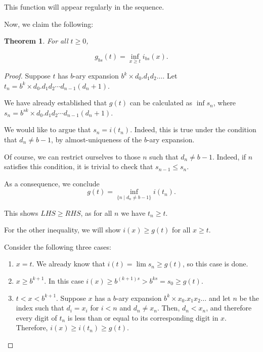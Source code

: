 \documentclass[11pt, reqno]{amsart}
\newtheorem{theorem}{Theorem}
\begin{document}
This function will appear regularly in the sequence.

Now, we claim the following:

\begin{theorem} \label{ginfi}
For all $t \geq 0$,

\[g_{bs}(t) = \inf_{x \geq t} i_{bs}(x).\]
\end{theorem}

\begin{proof}
Suppose $t$ has $b$-ary expansion $b^k \times d_0 . d_1 d_2 \dots$. Let $t_n = b^k \times d_0 . d_1 d_2 \cdots d_{n-1} (d_n + 1)$.

We have already established that $g(t)$ can be calculated as $\inf s_n$, where $s_n = b^{sk} \times d_0 . d_1 d_2 \cdots d_{n-1} (d_n + 1)$.

We would like to argue that $s_n = i(t_n)$. Indeed, this is true under the condition that $d_n \neq b-1$, by almost-uniqueness of the $b$-ary expansion.

Of course, we can restrict ourselves to those $n$ such that $d_n \neq b-1$. Indeed, if $n$ satisfies this condition, it is trivial to check that $s_{n-1} \leq s_n$.

As a consequence, we conclude
\[g(t) = \inf_{\{n \mid d_n \neq b-1\}} i(t_n).\]

This shows $LHS \geq RHS$, as for all $n$ we have $t_n \geq t$.

For the other inequality, we will show $i(x) \geq g(t)$ for all $x \geq t$.

Consider the following three cases:


\begin{enumerate}[label=\textbf{Case \arabic*:}]

\item $x = t$. We already know that $i(t) = \lim s_n \geq g(t)$, so this case is done.

\item $x \geq b^{k+1}$. In this case $i(x) \geq b^{(k+1)s} > b^{ks} = s_0 \geq g(t)$.

\item $t < x < b^{k+1}$. Suppose $x$ has a $b$-ary expansion $b^k \times x_0 . x_1 x_2 \dots$ and let $n$ be the index such that $d_i = x_i$ for $i < n$ and $d_n \neq x_n$. Then, $d_n < x_n$, and therefore every digit of $t_n$ is less than or equal to its corresponding digit in $x$. Therefore, $i(x) \geq i(t_n) \geq g(t)$.
\end{enumerate}
\end{proof}
\end{document}
